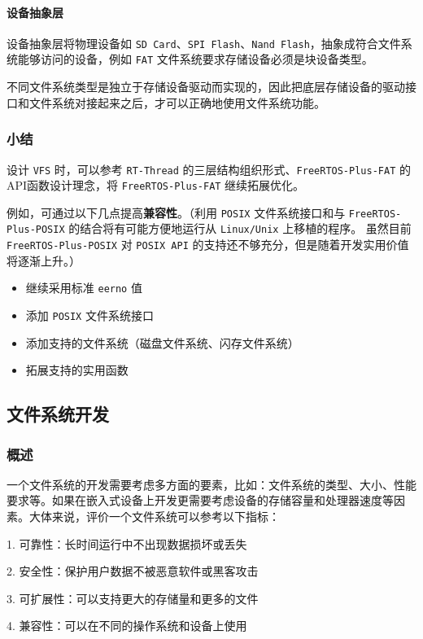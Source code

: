 \documentclass[UTF8,a4paper]{ctexart}
\begin{document}
\paragraph{设备抽象层}
设备抽象层将物理设备如 \texttt{SD Card}、\texttt{SPI Flash}、\texttt{Nand Flash}，抽象成符合文件系统能够访问的设备，例如 \texttt{FAT} 文件系统要求存储设备必须是块设备类型。

不同文件系统类型是独立于存储设备驱动而实现的，因此把底层存储设备的驱动接口和文件系统对接起来之后，才可以正确地使用文件系统功能。
\subsubsection{小结}
设计 \texttt{VFS} 时，可以参考 \texttt{RT-Thread} 的三层结构组织形式、\texttt{FreeRTOS-Plus-FAT} 的API函数设计理念，将 \texttt{FreeRTOS-Plus-FAT} 继续拓展优化。

例如，可通过以下几点提高\textbf{兼容性}。（利用 \texttt{POSIX} 文件系统接口和与 \texttt{FreeRTOS-Plus-POSIX} 的结合将有可能方便地运行从 \texttt{Linux/Unix} 上移植的程序。
虽然目前 \texttt{FreeRTOS-Plus-POSIX} 对 \texttt{POSIX API} 的支持还不够充分，但是随着开发实用价值将逐渐上升。）

\begin{itemize}
    \item 继续采用标准 \texttt{eerno} 值
    \item 添加 \texttt{POSIX} 文件系统接口
    \item 添加支持的文件系统（磁盘文件系统、闪存文件系统）
    \item 拓展支持的实用函数
\end{itemize}

\subsection{文件系统开发}
	\subsubsection{概述}
	一个文件系统的开发需要考虑多方面的要素，比如：文件系统的类型、大小、性能要求等。如果在嵌入式设备上开发更需要考虑设备的存储容量和处理器速度等因素。大体来说，评价一个文件系统可以参考以下指标：
	
	1. 可靠性：长时间运行中不出现数据损坏或丢失
	
	2. 安全性：保护用户数据不被恶意软件或黑客攻击
	
	3. 可扩展性：可以支持更大的存储量和更多的文件
	
	4. 兼容性：可以在不同的操作系统和设备上使用
	
\end{document}
